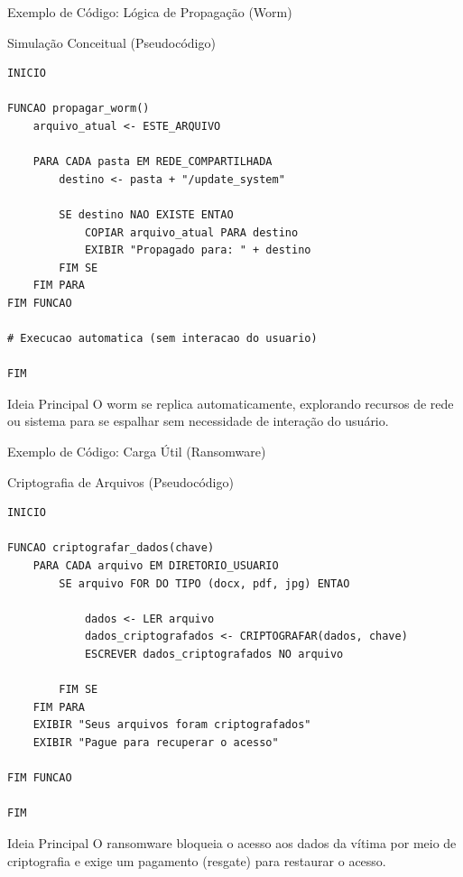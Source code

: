 \documentclass[aspectratio=169]{beamer}
\begin{document}
\begin{frame}[fragile]{Exemplo de Código: Lógica de Propagação (Worm)}
    \begin{block}{Simulação Conceitual (Pseudocódigo)}
    \scriptsize
\begin{lstlisting}
INICIO

FUNCAO propagar_worm()
    arquivo_atual <- ESTE_ARQUIVO
    
    PARA CADA pasta EM REDE_COMPARTILHADA
        destino <- pasta + "/update_system"
        
        SE destino NAO EXISTE ENTAO
            COPIAR arquivo_atual PARA destino
            EXIBIR "Propagado para: " + destino
        FIM SE
    FIM PARA
FIM FUNCAO

# Execucao automatica (sem interacao do usuario)

FIM
\end{lstlisting}
    \end{block}

    \begin{block}{Ideia Principal}
        O worm se replica automaticamente, explorando recursos de rede ou sistema 
        para se espalhar sem necessidade de interação do usuário.
    \end{block}
\end{frame}
\begin{frame}[fragile]{Exemplo de Código: Carga Útil (Ransomware)}
    \begin{block}{Criptografia de Arquivos (Pseudocódigo)}
    \scriptsize
\begin{lstlisting}
INICIO

FUNCAO criptografar_dados(chave)
    PARA CADA arquivo EM DIRETORIO_USUARIO
        SE arquivo FOR DO TIPO (docx, pdf, jpg) ENTAO
            
            dados <- LER arquivo
            dados_criptografados <- CRIPTOGRAFAR(dados, chave)
            ESCREVER dados_criptografados NO arquivo
            
        FIM SE
    FIM PARA
    EXIBIR "Seus arquivos foram criptografados"
    EXIBIR "Pague para recuperar o acesso"

FIM FUNCAO

FIM
\end{lstlisting}
    \end{block}

    \begin{block}{Ideia Principal}
        O ransomware bloqueia o acesso aos dados da vítima por meio de criptografia 
        e exige um pagamento (resgate) para restaurar o acesso.
    \end{block}
\end{frame}
\end{document}
